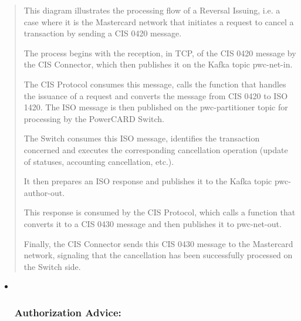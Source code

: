 \documentclass[12pt,a4paper]{report}
\begin{document}
\begin{quote}
This diagram illustrates the processing flow of a Reversal Issuing, i.e.
a case where it is the Mastercard network that initiates a request to
cancel a transaction by sending a CIS 0420 message.

The process begins with the reception, in TCP, of the CIS 0420 message
by the CIS Connector, which then publishes it on the Kafka topic
pwc-net-in.

The CIS Protocol consumes this message, calls the function that handles
the issuance of a request and converts the message from CIS 0420 to ISO
1420. The ISO message is then published on the pwc-partitioner topic for
processing by the PowerCARD Switch.

The Switch consumes this ISO message, identifies the transaction
concerned and executes the corresponding cancellation operation (update
of statuses, accounting cancellation, etc.).

It then prepares an ISO response and publishes it to the Kafka topic
pwc-author-out.

This response is consumed by the CIS Protocol, which calls a function
that converts it to a CIS 0430 message and then publishes it to
pwc-net-out.

Finally, the CIS Connector sends this CIS 0430 message to the Mastercard
network, signaling that the cancellation has been successfully processed
on the Switch side.
\end{quote}

\begin{itemize}
\item ~
  \hypertarget{authorization-advice}{%
  \subsubsection{\texorpdfstring{\textbf{Authorization
  Advice:}}{Authorization Advice:}}\label{authorization-advice}}
\end{itemize}
\end{document}
